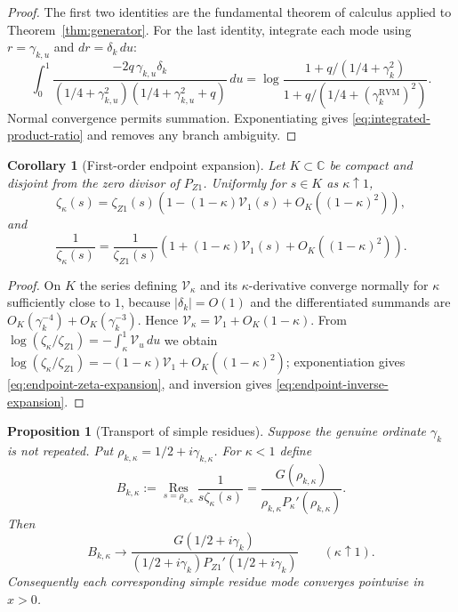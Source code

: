 \documentclass[11pt,reqno]{amsart}
\newtheorem{proposition}[theorem]{Proposition}
\newtheorem{corollary}[theorem]{Corollary}
\theoremstyle{definition}
\theoremstyle{remark}
\newcommand{\C}{\mathbb C}
\newcommand{\Res}{\operatorname*{Res}}
\newcommand{\RVM}{\mathrm{RVM}}
\begin{document}
\begin{proof}
The first two identities are the fundamental theorem of calculus applied to Theorem~\ref{thm:generator}.  For the last identity, integrate each mode using $r=\gamma_{k,u}$ and $dr=\delta_k\,du$:
\[
 \int_0^1
 \frac{-2q\,\gamma_{k,u}\delta_k}
 {(1/4+\gamma_{k,u}^2)(1/4+\gamma_{k,u}^2+q)}\,du
 =\log\frac{1+q/(1/4+\gamma_k^2)}
 {1+q/(1/4+(\gamma_k^{\RVM})^2)}.
\]
Normal convergence permits summation.  Exponentiating gives \eqref{eq:integrated-product-ratio} and removes any branch ambiguity.
\end{proof}

\begin{corollary}[First-order endpoint expansion]\label{cor:endpoint-expansion}
Let $K\subset\C$ be compact and disjoint from the zero divisor of $P_{Z1}$.  Uniformly for $s\in K$ as $\kappa\uparrow1$,
\begin{equation}\label{eq:endpoint-zeta-expansion}
 \zeta_\kappa(s)=\zeta_{Z1}(s)
 \left(1-(1-\kappa)\mathcal V_1(s)+O_K((1-\kappa)^2)\right),
\end{equation}
and
\begin{equation}\label{eq:endpoint-inverse-expansion}
 \frac1{\zeta_\kappa(s)}=\frac1{\zeta_{Z1}(s)}
 \left(1+(1-\kappa)\mathcal V_1(s)+O_K((1-\kappa)^2)\right).
\end{equation}
\end{corollary}

\begin{proof}
On $K$ the series defining $\mathcal V_\kappa$ and its $\kappa$-derivative converge normally for $\kappa$ sufficiently close to $1$, because $|\delta_k|=O(1)$ and the differentiated summands are $O_K(\gamma_k^{-4})+O_K(\gamma_k^{-3})$.  Hence
$\mathcal V_\kappa=\mathcal V_1+O_K(1-\kappa)$.  From
$\log(\zeta_\kappa/\zeta_{Z1})=-\int_\kappa^1\mathcal V_u\,du$ we obtain
$\log(\zeta_\kappa/\zeta_{Z1})=-(1-\kappa)\mathcal V_1+O_K((1-\kappa)^2)$; exponentiation gives \eqref{eq:endpoint-zeta-expansion}, and inversion gives \eqref{eq:endpoint-inverse-expansion}.
\end{proof}

\begin{proposition}[Transport of simple residues]\label{prop:residues}
Suppose the genuine ordinate $\gamma_k$ is not repeated.  Put
$\rho_{k,\kappa}=1/2+i\gamma_{k,\kappa}$.  For $\kappa<1$ define
\begin{equation}\label{eq:residue-transport}
 B_{k,\kappa}
 :=\Res_{s=\rho_{k,\kappa}}
 \frac{1}{s\zeta_\kappa(s)}
 =\frac{G(\rho_{k,\kappa})}
 {\rho_{k,\kappa}P_\kappa'(\rho_{k,\kappa})}.
\end{equation}
Then
\begin{equation}
 B_{k,\kappa}\longrightarrow
 \frac{G(1/2+i\gamma_k)}
 {(1/2+i\gamma_k)P_{Z1}'(1/2+i\gamma_k)}
 \qquad(\kappa\uparrow1).
\end{equation}
Consequently each corresponding simple residue mode converges pointwise in $x>0$.
\end{proposition}
\end{document}
